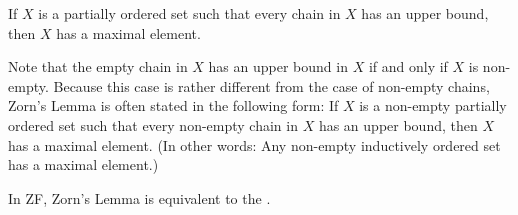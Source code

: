 \documentclass[12pt]{article}
\begin{document}

If $X$ is a partially ordered set
such that every chain in $X$ has an upper bound,
then $X$ has a maximal element.

Note that the empty chain in $X$ has an upper bound in $X$
if and only if $X$ is non-empty.
Because this case is rather different from the case of non-empty chains,
Zorn's Lemma is often stated in the following form:
If $X$ is a non-empty partially ordered set
such that every non-empty chain in $X$ has an upper bound,
then $X$ has a maximal element.
(In other words: Any non-empty inductively ordered set has a maximal element.)

In ZF, Zorn's Lemma is equivalent to the .

\end{document}
